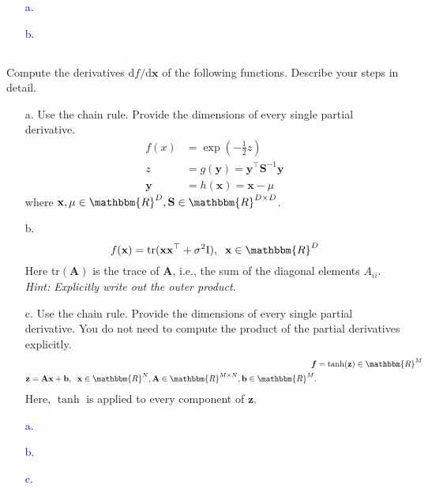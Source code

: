 \documentclass[a4paper,12pt]{article}
\newcommand{\R}{\mathbbm{R}}
\newcommand{\vecx}{\textbf{x}}
\newcommand{\vecy}{\textbf{y}}
\newcommand{\vecz}{\textbf{z}}
\newcommand{\vecb}{\textbf{b}}
\newcommand{\matA}{\textbf{A}}
\newcommand{\inv}{^{-1}}
\begin{document}
\textcolor{blue}{
\begin{itemize}
 \item [a.]
 \item [b.]
\end{itemize}
}
\subsection{}
Compute the derivatives $\textrm{d}f/\textrm{d}\vecx$ of the following functions. Describe your steps in detail.
\begin{itemize}
 \item [a.] Use the chain rule. Provide the dimensions of every single partial derivative.
 \begin{align*}
 f(x) &= \exp(-\frac{1}{2}z) \\
 z &= g(\vecy) = \vecy^\top \textbf{S}\inv \vecy \\
 \vecy &= h(\vecx) = \vecx - \mu
 \end{align*}
 where $\vecx, \mu \in \R^D, \textbf{S} \in \R^{D \times D}$.
 \item [b.] $$f(\vecx) = \textrm{tr}(\vecx \vecx^\top + \sigma^2 \textrm{I}), \;\; \vecx \in \R^D$$
 Here tr$(\matA)$ is the trace of $\matA$, i.e., the sum of the diagonal elements $A_{ii}$. \\
 \textit{Hint: Explicitly write out the outer product.}
 \item [c.] Use the chain rule. Provide the dimensions of every single partial derivative. You do not need to compute the product of the partial derivatives explicitly.
 \begin{align*}
 \textbf{\textit{f}} &= \tanh(\vecz) \in \R^M \\
 \vecz = \matA \vecx + \vecb, \;\; \vecx \in \R^N, \matA \in \R^{M \times N}, \vecb \in \R^M.
 \end{align*}
 Here, $\tanh$ is applied to every component of $\vecz$.
\end{itemize}
\textcolor{blue}{
\begin{itemize}
 \item [a.]
 \item [b.]
 \item [c.]
\end{itemize}
}
\end{document}
